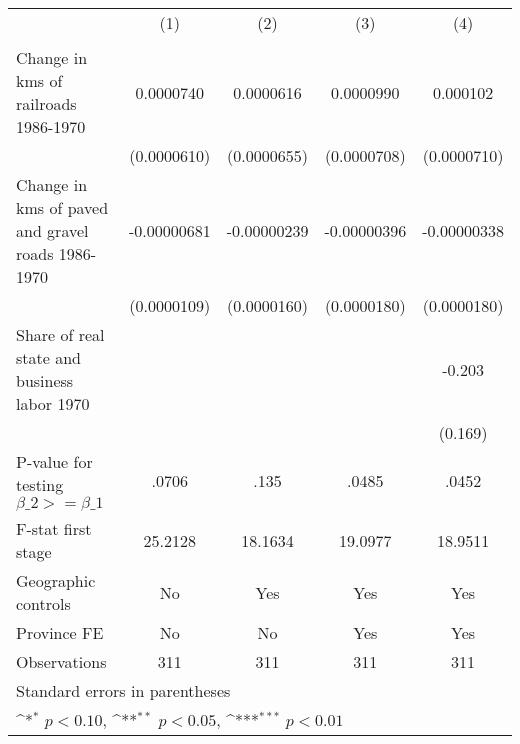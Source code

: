 {
\def\sym#1{\ifmmode^{#1}\else\(^{#1}\)\fi}
\begin{tabular}{l*{4}{c}}
\hline\hline
                &\multicolumn{1}{c}{(1)}&\multicolumn{1}{c}{(2)}&\multicolumn{1}{c}{(3)}&\multicolumn{1}{c}{(4)}\\
                &\multicolumn{1}{c}{}&\multicolumn{1}{c}{}&\multicolumn{1}{c}{}&\multicolumn{1}{c}{}\\
\hline
Change in kms of railroads 1986-1970&0.0000740         &0.0000616         &0.0000990         & 0.000102         \\
                &(0.0000610)         &(0.0000655)         &(0.0000708)         &(0.0000710)         \\
[1em]
Change in kms of paved and gravel roads 1986-1970&-0.00000681         &-0.00000239         &-0.00000396         &-0.00000338         \\
                &(0.0000109)         &(0.0000160)         &(0.0000180)         &(0.0000180)         \\
[1em]
Share of real state and business labor 1970&                  &                  &                  &   -0.203         \\
                &                  &                  &                  &  (0.169)         \\
\hline
P-value for testing $\beta\_{2} >= \beta\_{1}$&    .0706         &     .135         &    .0485         &    .0452         \\
F-stat first stage&  25.2128         &  18.1634         &  19.0977         &  18.9511         \\
Geographic controls&       No         &      Yes         &      Yes         &      Yes         \\
Province FE     &       No         &       No         &      Yes         &      Yes         \\
Observations    &      311         &      311         &      311         &      311         \\
\hline\hline
\multicolumn{5}{l}{\footnotesize Standard errors in parentheses}\\
\multicolumn{5}{l}{\footnotesize \sym{*} \(p<0.10\), \sym{**} \(p<0.05\), \sym{***} \(p<0.01\)}\\
\end{tabular}
}
